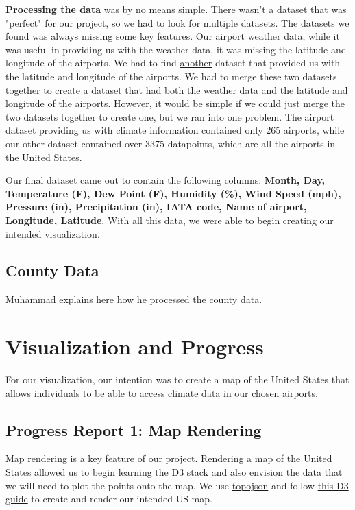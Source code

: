 \documentclass[9pt,twocolumn,twoside]{opticajnl}
\begin{document}
\textbf{Processing the data} was by no means simple. There wasn't a dataset that was "perfect" for our project, so we had to look for multiple datasets. The datasets we found was always missing some key features. Our airport weather data, while it was useful in providing us with the weather data, it was missing the latitude and longitude of the airports. We had to find \href{https://www.kaggle.com/datasets/nancyalaswad90/us-airports}{another} dataset that provided us with the latitude and longitude of the airports. We had to merge these two datasets together to create a dataset that had both the weather data and the latitude and longitude of the airports. However, it would be simple if we could just merge the two datasets together to create one, but we ran into one problem. The airport dataset providing us with climate information contained only 265 airports, while our other dataset contained over 3375 datapoints, which are all the airports in the United States.

Our final dataset came out to contain the following columns: \textbf{Month, Day, Temperature (F), Dew Point (F), Humidity (\%), Wind Speed (mph), Pressure (in), Precipitation (in), IATA code, Name of airport, Longitude, Latitude}. With all this data, we were able to begin creating our intended visualization.

\subsection{County Data}

Muhammad explains here how he processed the county data.

\section {Visualization and Progress}

For our visualization, our intention was to create a map of the United States that allows individuals to be able to access climate data in our chosen airports. 

\subsection{Progress Report 1: Map Rendering}

Map rendering is a key feature of our project. Rendering a map of the United States allowed us to begin learning the D3 stack and also envision the data that we will need to plot the points onto the map. We use \href{https://github.com/topojson/topojson}{topojson} and follow \href{https://observablehq.com/@d3/u-s-map}{this D3 guide} to create and render our intended US map.
\end{document}
